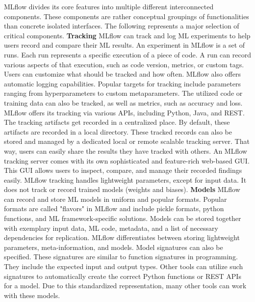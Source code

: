 MLflow divides its core features into multiple different interconnected components.
These components are rather conceptual groupings of functionalities than concrete isolated interfaces.
The following represents a major selection of critical components.
\vspace{5mm}
\newline
\textbf{Tracking}\newline
MLflow can track and log ML experiments to help users record and compare their ML results.
An experiment in MLflow is a set of runs.
Each run represents a specific execution of a piece of code.
A run can record various aspects of that execution, such as code version, metrics, or custom tags.
Users can customize what should be tracked and how often.
MLflow also offers automatic logging capabilities.
Popular targets for tracking include parameters ranging from hyperparameters to custom metaparameters.
The utilized code or training data can also be tracked, as well as metrics, such as accuracy and loss.
MLflow offers its tracking via various APIs, including Python, Java, and REST.
The tracking artifacts get recorded in a centralized place.
By default, these artifacts are recorded in a local directory.
These tracked records can also be stored and managed by a dedicated local or remote scalable tracking server.
That way, users can easily share the results they have tracked with others.
An MLflow tracking server comes with its own sophisticated and feature-rich web-based GUI.
This GUI allows users to inspect, compare, and manage their recorded findings easily.
MLflow tracking handles lightweight parameters, except for input data.
It does not track or record trained models (weights and biases).
\vspace{5mm}
\newline
\textbf{Models}\newline
MLflow can record and store ML models in uniform and popular formats.
Popular formats are called "flavors" in MLflow and include pickle formats, python functions, and ML framework-specific solutions.
Models can be stored together with exemplary input data, ML code, metadata, and a list of necessary dependencies for replication.
MLflow differentiates between storing lightweight parameters, meta-information, and models.
Model signatures can also be specified.
These signatures are similar to function signatures in programming.
They include the expected input and output types.
Other tools can utilize such signatures to automatically create the correct Python functions or REST APIs for a model.
Due to this standardized representation, many other tools can work with these models.

